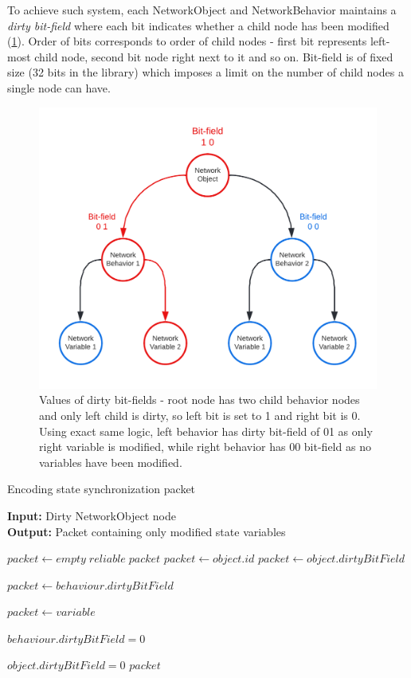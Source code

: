\documentclass[times, utf8, diplomski]{fer}
\begin{document}
To achieve such system, each NetworkObject and NetworkBehavior maintains a \textit{dirty bit-field} where each bit indicates whether a child node has been modified (\ref{fig:network-object-bit-field}). Order of bits corresponds to order of child nodes - first bit represents left-most child node, second bit node right next to it and so on. Bit-field is of fixed size (32 bits in the library) which imposes a limit on the number of child nodes a single node can have.

\begin{figure}[H]
	\centering
	\includegraphics[scale=0.3]{NetworkObject-bit-field}
	\caption{Values of dirty bit-fields - root node has two child behavior nodes and only left child is dirty, so left bit is set to 1 and right bit is 0. Using exact same logic, left behavior has dirty bit-field of 01 as only right variable is modified, while right behavior has 00 bit-field as no variables have been modified.}
	\label{fig:network-object-bit-field}
\end{figure}

\begin{algorithm}[H]
	\caption{Encoding state synchronization packet}
	\textbf{Input:} Dirty NetworkObject node \\
	\textbf{Output:} Packet containing only modified state variables \\
	
	\begin{algorithmic}
		\State $packet \gets empty \; reliable \; packet$
		\State $packet \gets object.id$
		\State $packet \gets object.dirtyBitField$
		\State
		
			\State $packet \gets behaviour.dirtyBitField$
			\State
			
				\State $packet \gets variable$
			\EndFor
			
			\State
			\State $behaviour.dirtyBitField = 0$
		\EndFor
		
		\State
		\State $object.dirtyBitField = 0$
		\State \Return $packet$
	\end{algorithmic}
\end{algorithm}
\end{document}

